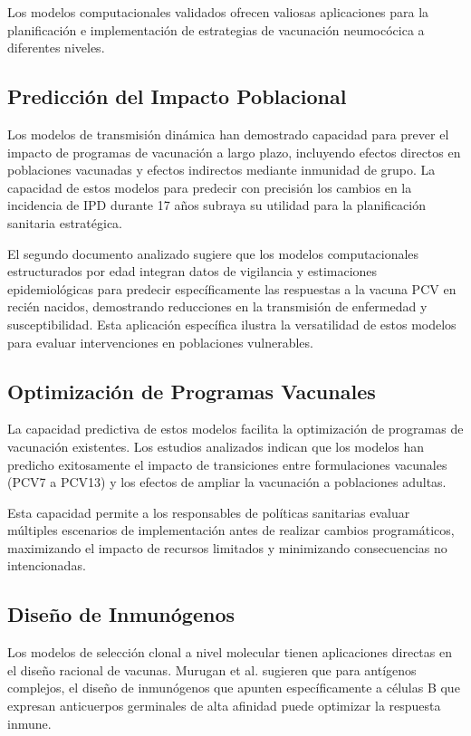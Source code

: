 Los modelos computacionales validados ofrecen valiosas aplicaciones para la planificación e implementación de estrategias de vacunación neumocócica a diferentes niveles.

\subsection{Predicción del Impacto Poblacional}

Los modelos de transmisión dinámica han demostrado capacidad para prever el impacto de programas de vacunación a largo plazo, incluyendo efectos directos en poblaciones vacunadas y efectos indirectos mediante inmunidad de grupo. La capacidad de estos modelos para predecir con precisión los cambios en la incidencia de IPD durante 17 años subraya su utilidad para la planificación sanitaria estratégica.

El segundo documento analizado sugiere que los modelos computacionales estructurados por edad integran datos de vigilancia y estimaciones epidemiológicas para predecir específicamente las respuestas a la vacuna PCV en recién nacidos, demostrando reducciones en la transmisión de enfermedad y susceptibilidad. Esta aplicación específica ilustra la versatilidad de estos modelos para evaluar intervenciones en poblaciones vulnerables.

\subsection{Optimización de Programas Vacunales}

La capacidad predictiva de estos modelos facilita la optimización de programas de vacunación existentes. Los estudios analizados indican que los modelos han predicho exitosamente el impacto de transiciones entre formulaciones vacunales (PCV7 a PCV13) y los efectos de ampliar la vacunación a poblaciones adultas.

Esta capacidad permite a los responsables de políticas sanitarias evaluar múltiples escenarios de implementación antes de realizar cambios programáticos, maximizando el impacto de recursos limitados y minimizando consecuencias no intencionadas.

\subsection{Diseño de Inmunógenos}

Los modelos de selección clonal a nivel molecular tienen aplicaciones directas en el diseño racional de vacunas. Murugan et al. \cite{Murugan2018} sugieren que para antígenos complejos, el diseño de inmunógenos que apunten específicamente a células B que expresan anticuerpos germinales de alta afinidad puede optimizar la respuesta inmune.

